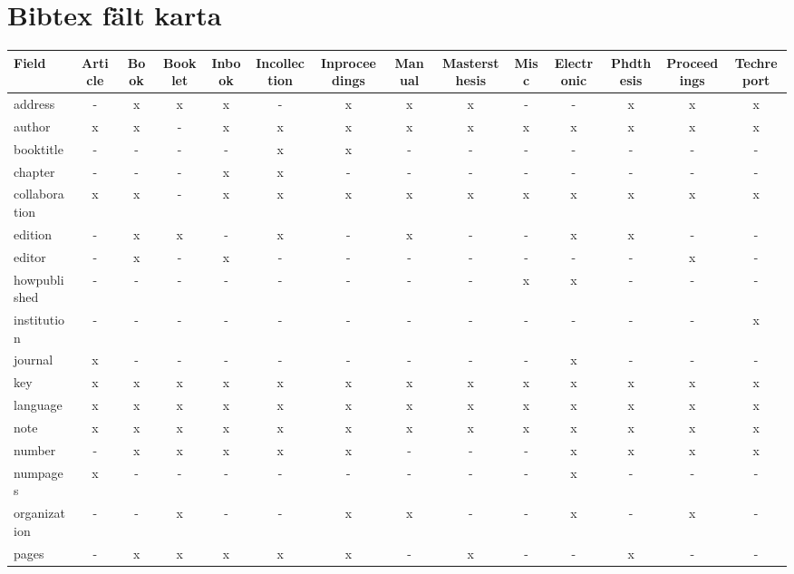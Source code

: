 \section{Bibtex fält karta}
\vspace{-20pt}

\begin{singlespacing}
\begin{sideways}
\footnotesize

\begin{tabular}{l c c c c c c c c c c c c c}
Field & Article & Book & Booklet & Inbook & Incollection & Inproceedings & Manual & Mastersthesis & Misc & Electronic & Phdthesis & Proceedings & Techreport \\
\hline
address       & - & x & x & x & - & x & x & x & - & - & x & x & x \\
author        & x & x & - & x & x & x & x & x & x & x & x & x & x \\
booktitle     & - & - & - & - & x & x & - & - & - & - & - & - & - \\
chapter       & - & - & - & x & x & - & - & - & - & - & - & - & - \\
collaboration & x & x & - & x & x & x & x & x & x & x & x & x & x \\
edition       & - & x & x & - & x & - & x & - & - & x & x & - & - \\
editor        & - & x & - & x & - & - & - & - & - & - & - & x & - \\
howpublished  & - & - & - & - & - & - & - & - & x & x & - & - & - \\
institution   & - & - & - & - & - & - & - & - & - & - & - & - & x \\
journal       & x & - & - & - & - & - & - & - & - & x & - & - & - \\
key           & x & x & x & x & x & x & x & x & x & x & x & x & x \\
language      & x & x & x & x & x & x & x & x & x & x & x & x & x \\
note          & x & x & x & x & x & x & x & x & x & x & x & x & x \\
number        & - & x & x & x & x & x & - & - & - & x & x & x & x \\
numpages      & x & - & - & - & - & - & - & - & - & x & - & - & - \\
organization  & - & - & x & - & - & x & x & - & - & x & - & x & - \\
pages         & - & x & x & x & x & x & - & x & - & - & x & - & - \\

\end{tabular}
\end{sideways}
\end{singlespacing}
